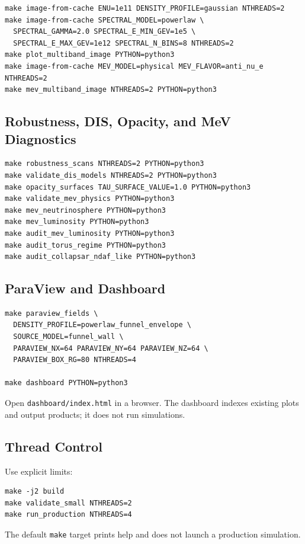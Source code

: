 \documentclass[11pt,a4paper]{article}
\begin{document}
\begin{verbatim}
make image-from-cache ENU=1e11 DENSITY_PROFILE=gaussian NTHREADS=2
make image-from-cache SPECTRAL_MODEL=powerlaw \
  SPECTRAL_GAMMA=2.0 SPECTRAL_E_MIN_GEV=1e5 \
  SPECTRAL_E_MAX_GEV=1e12 SPECTRAL_N_BINS=8 NTHREADS=2
make plot_multiband_image PYTHON=python3
make image-from-cache MEV_MODEL=physical MEV_FLAVOR=anti_nu_e NTHREADS=2
make mev_multiband_image NTHREADS=2 PYTHON=python3
\end{verbatim}

\subsection{Robustness, DIS, Opacity, and MeV Diagnostics}

\begin{verbatim}
make robustness_scans NTHREADS=2 PYTHON=python3
make validate_dis_models NTHREADS=2 PYTHON=python3
make opacity_surfaces TAU_SURFACE_VALUE=1.0 PYTHON=python3
make validate_mev_physics PYTHON=python3
make mev_neutrinosphere PYTHON=python3
make mev_luminosity PYTHON=python3
make audit_mev_luminosity PYTHON=python3
make audit_torus_regime PYTHON=python3
make audit_collapsar_ndaf_like PYTHON=python3
\end{verbatim}

\subsection{ParaView and Dashboard}

\begin{verbatim}
make paraview_fields \
  DENSITY_PROFILE=powerlaw_funnel_envelope \
  SOURCE_MODEL=funnel_wall \
  PARAVIEW_NX=64 PARAVIEW_NY=64 PARAVIEW_NZ=64 \
  PARAVIEW_BOX_RG=80 NTHREADS=4

make dashboard PYTHON=python3
\end{verbatim}

Open \texttt{dashboard/index.html} in a browser. The dashboard indexes existing
plots and output products; it does not run simulations.

\subsection{Thread Control}

Use explicit limits:
\begin{verbatim}
make -j2 build
make validate_small NTHREADS=2
make run_production NTHREADS=4
\end{verbatim}
The default \texttt{make} target prints help and does not launch a production
simulation.
\end{document}
